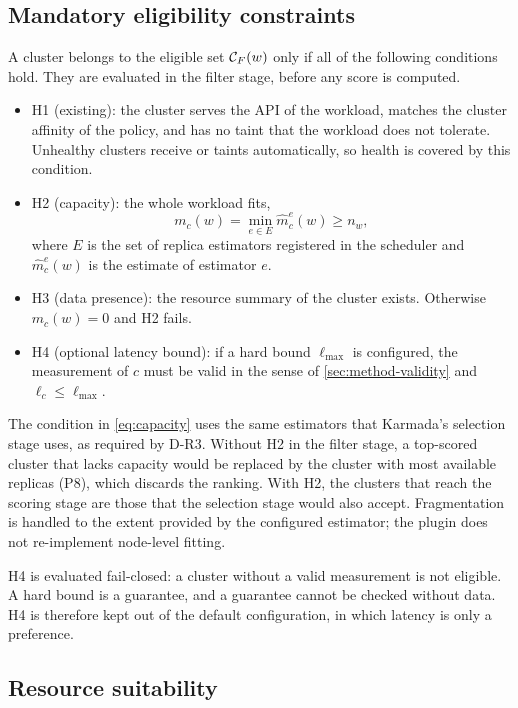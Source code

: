 \subsection{Mandatory eligibility constraints}\label{sec:method-hard}

A cluster belongs to the eligible set $\mathcal{C}_{F}(w)$ only if all of the following conditions hold. They are evaluated in the filter stage, before any score is computed.
\begin{itemize}
  \item H1 (existing): the cluster serves the API of the workload, matches the cluster affinity of the policy, and has no taint that the workload does not tolerate. Unhealthy clusters receive  or  taints automatically, so health is covered by this condition.
  \item H2 (capacity): the whole workload fits,
  \begin{equation}\label{eq:capacity}
    m_c(w) = \min_{e \in E} \widehat{m}_{c}^{e}(w) \geq n_w,
  \end{equation}
  where $E$ is the set of replica estimators registered in the scheduler and $\widehat{m}_{c}^{e}(w)$ is the estimate of estimator $e$.
  \item H3 (data presence): the resource summary of the cluster exists. Otherwise $m_c(w) = 0$ and H2 fails.
  \item H4 (optional latency bound): if a hard bound $\ell_{\max}$ is configured, the measurement of $c$ must be valid in the sense of \cref{sec:method-validity} and $\ell_c \leq \ell_{\max}$.
\end{itemize}

The condition in \cref{eq:capacity} uses the same estimators that Karmada's selection stage uses, as required by D-R3. Without H2 in the filter stage, a top-scored cluster that lacks capacity would be replaced by the cluster with most available replicas (P8), which discards the ranking. With H2, the clusters that reach the scoring stage are those that the selection stage would also accept. Fragmentation is handled to the extent provided by the configured estimator; the plugin does not re-implement node-level fitting.

H4 is evaluated fail-closed: a cluster without a valid measurement is not eligible. A hard bound is a guarantee, and a guarantee cannot be checked without data. H4 is therefore kept out of the default configuration, in which latency is only a preference.

\subsection{Resource suitability}\label{sec:method-resource}

